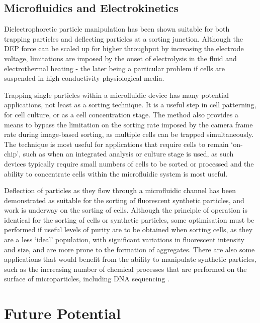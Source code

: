\subsection{Microfluidics and Electrokinetics}

Dielectrophoretic particle manipulation has been shown suitable for both trapping particles and deflecting particles at a sorting junction. Although the DEP force can be scaled up for higher throughput by increasing the electrode voltage, limitations are imposed by the onset of electrolysis in the fluid and electrothermal heating - the later being a particular problem if cells are suspended in high conductivity physiological media. 
 
Trapping single particles within a microfluidic device has many potential applications, not least as a sorting technique. It is a useful step in cell patterning, for cell culture, or as a cell concentration stage. The method also provides a means to bypass the limitation on the sorting rate imposed by the camera frame rate during image-based sorting, as multiple cells can be trapped simultaneously. The technique is most useful for applications that require cells to remain `on-chip', such as when an integrated analysis or culture stage is used, as such devices typically require small numbers of cells to be sorted or processed and the ability to concentrate cells within the microfluidic system is most useful. 

Deflection of particles as they flow through a microfluidic channel has been demonstrated as suitable for the sorting of fluorescent synthetic particles, and work is underway on the sorting of cells. Although the principle of operation is identical for the sorting of cells or synthetic particles, some optimisation must be performed if useful levels of purity are to be obtained when sorting cells, as they are a less `ideal' population, with significant variations in fluorescent intensity and size, and are more prone to the formation of aggregates. There are also some applications that would benefit from the ability to manipulate synthetic particles, such as the increasing number of chemical processes that are performed on the surface of microparticles, including DNA sequencing \citep{Hultman:1989}.

\section{Future Potential}


